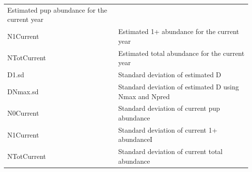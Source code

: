 \documentclass[
]{article}
\begin{document}
\begin{longtable}[]{@{}ll@{}}
\begin{minipage}[t]{0.38\columnwidth}
Estimated pup abundance for the current year\strut
\end{minipage}\tabularnewline
\begin{minipage}[t]{0.31\columnwidth}\raggedright
N1Current\strut
\end{minipage} & \begin{minipage}[t]{0.38\columnwidth}\raggedright
Estimated 1+ abundance for the current year\strut
\end{minipage}\tabularnewline
\begin{minipage}[t]{0.31\columnwidth}\raggedright
NTotCurrent\strut
\end{minipage} & \begin{minipage}[t]{0.38\columnwidth}\raggedright
Estimated total abundance for the current year\strut
\end{minipage}\tabularnewline
\begin{minipage}[t]{0.31\columnwidth}\raggedright
D1.sd\strut
\end{minipage} & \begin{minipage}[t]{0.38\columnwidth}\raggedright
Standard deviation of estimated D\strut
\end{minipage}\tabularnewline
\begin{minipage}[t]{0.31\columnwidth}\raggedright
DNmax.sd\strut
\end{minipage} & \begin{minipage}[t]{0.38\columnwidth}\raggedright
Standard deviation of estimated D using Nmax and Npred\strut
\end{minipage}\tabularnewline
\begin{minipage}[t]{0.31\columnwidth}\raggedright
N0Current\strut
\end{minipage} & \begin{minipage}[t]{0.38\columnwidth}\raggedright
Standard deviation of current pup abundance\strut
\end{minipage}\tabularnewline
\begin{minipage}[t]{0.31\columnwidth}\raggedright
N1Current\strut
\end{minipage} & \begin{minipage}[t]{0.38\columnwidth}\raggedright
Standard deviation of current 1+ abundanceI\strut
\end{minipage}\tabularnewline
\begin{minipage}[t]{0.31\columnwidth}\raggedright
NTotCurrent\strut
\end{minipage} & \begin{minipage}[t]{0.38\columnwidth}\raggedright
Standard deviation of current total abundance\strut
\end{minipage}\tabularnewline
\bottomrule
\end{longtable}
\end{document}
